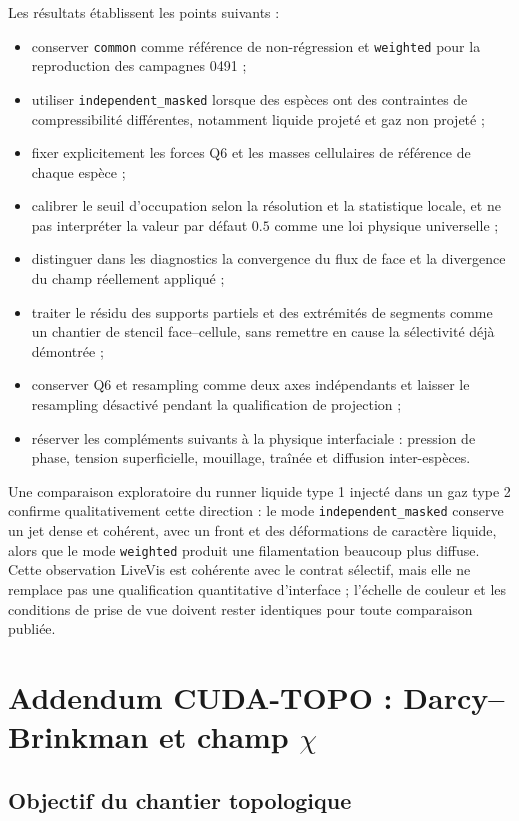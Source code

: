 \documentclass[11pt,a4paper]{article}
\begin{document}
Les résultats établissent les points suivants :
\begin{itemize}
  \item conserver \texttt{common} comme référence de non-régression et \texttt{weighted} pour la reproduction des campagnes 0491 ;
  \item utiliser \texttt{independent\_masked} lorsque des espèces ont des contraintes de compressibilité différentes, notamment liquide projeté et gaz non projeté ;
  \item fixer explicitement les forces Q6 et les masses cellulaires de référence de chaque espèce ;
  \item calibrer le seuil d'occupation selon la résolution et la statistique locale, et ne pas interpréter la valeur par défaut $0.5$ comme une loi physique universelle ;
  \item distinguer dans les diagnostics la convergence du flux de face et la divergence du champ réellement appliqué ;
  \item traiter le résidu des supports partiels et des extrémités de segments comme un chantier de stencil face--cellule, sans remettre en cause la sélectivité déjà démontrée ;
  \item conserver Q6 et resampling comme deux axes indépendants et laisser le resampling désactivé pendant la qualification de projection ;
  \item réserver les compléments suivants à la physique interfaciale : pression de phase, tension superficielle, mouillage, traînée et diffusion inter-espèces.
\end{itemize}

Une comparaison exploratoire du runner liquide type 1 injecté dans un gaz type 2 confirme qualitativement cette direction : le mode \texttt{independent\_masked} conserve un jet dense et cohérent, avec un front et des déformations de caractère liquide, alors que le mode \texttt{weighted} produit une filamentation beaucoup plus diffuse. Cette observation LiveVis est cohérente avec le contrat sélectif, mais elle ne remplace pas une qualification quantitative d'interface ; l'échelle de couleur et les conditions de prise de vue doivent rester identiques pour toute comparaison publiée.

\section{Addendum CUDA-TOPO : Darcy--Brinkman et champ \texorpdfstring{$\chi$}{chi}}

\subsection{Objectif du chantier topologique}
\end{document}
